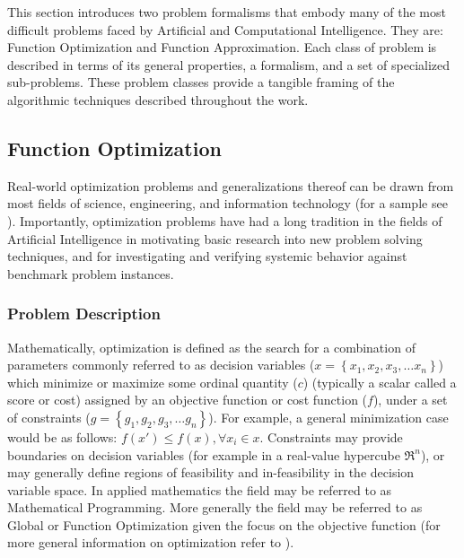\begin{bibunit}
This section introduces two problem formalisms that embody many of the most difficult problems faced by Artificial and Computational Intelligence. They are: Function Optimization and Function Approximation. Each class of problem is described in terms of its general properties, a formalism, and a set of specialized sub-problems. These problem classes provide a tangible framing of the algorithmic techniques described throughout the work.

% 
%
\subsection{Function Optimization}
\label{subsec:function_optimization}
Real-world optimization problems and generalizations thereof can be drawn from most fields of science, engineering, and information technology (for a sample see \cite{Ali1997, Toern1999}). Importantly, optimization problems have had a long tradition in the fields of Artificial Intelligence in motivating basic research into new problem solving techniques, and for investigating and verifying systemic behavior against benchmark problem instances.

%
%
\subsubsection{Problem Description}
Mathematically, optimization is defined as the search for a combination of parameters commonly referred to as decision variables ($x = \left\{x_1, x_2, x_3, \ldots x_n\right\}$) which minimize or maximize some ordinal quantity ($c$) (typically a scalar  called a score or cost) assigned by an objective function or cost function ($f$), under a set of constraints ($g = \left\{g_1, g_2, g_3, \ldots g_n\right\}$). For example, a general minimization case would be as follows: $f(x\prime) \leq f(x), \forall x_i \in x$. Constraints may provide boundaries on decision variables (for example in a real-value hypercube $\Re^n$), or may generally define regions of feasibility and in-feasibility in the decision variable space. In applied mathematics the field may be referred to as Mathematical Programming. More generally the field may be referred to as Global or Function Optimization given the focus on the objective function (for more general information on optimization refer to \cite{Horst2000}). 

%
%

\end{bibunit}
